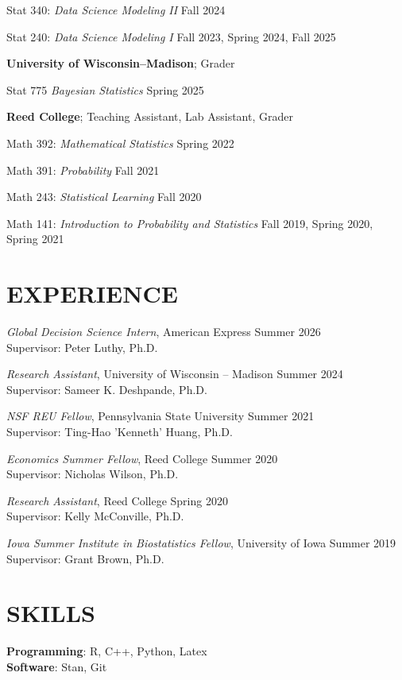 \documentclass[margin]{res}
\begin{document}
\begin{resume}
Stat 340: {\it Data Science Modeling II} \hfill Fall 2024

Stat 240: {\it Data Science Modeling I} \hfill Fall 2023, Spring 2024, Fall 2025

\textbf{University of Wisconsin--Madison}; Grader

Stat 775 {\it Bayesian Statistics} \hfill Spring 2025

\textbf{Reed College}; Teaching Assistant, Lab Assistant, Grader 

Math 392: {\it Mathematical Statistics} \hfill Spring 2022

Math 391: {\it Probability} \hfill Fall 2021

Math 243: {\it Statistical Learning} \hfill Fall 2020

Math 141: {\it Introduction to Probability and Statistics} \hfill Fall 2019, Spring 2020, Spring 2021


\section{EXPERIENCE}

\emph{Global Decision Science Intern}, American Express \hfill Summer 2026 \\
Supervisor: Peter Luthy, Ph.D.

\emph{Research Assistant}, University of Wisconsin -- Madison \hfill Summer 2024 \\
Supervisor: Sameer K. Deshpande, Ph.D.

\emph{NSF REU Fellow}, Pennsylvania State University \hfill Summer 2021 \\
Supervisor: Ting-Hao 'Kenneth' Huang, Ph.D.

\emph{Economics Summer Fellow}, Reed College \hfill Summer 2020 \\
Supervisor: Nicholas Wilson, Ph.D.

\emph{Research Assistant}, Reed College \hfill Spring 2020 \\
Supervisor: Kelly McConville, Ph.D.

\emph{Iowa Summer Institute in Biostatistics Fellow}, University of Iowa \hfill Summer 2019 \\
Supervisor: Grant Brown, Ph.D.


\section{SKILLS}

\textbf{Programming}: R, C++, Python, Latex \\
\textbf{Software}: Stan, Git

\end{resume} 
\end{document}
